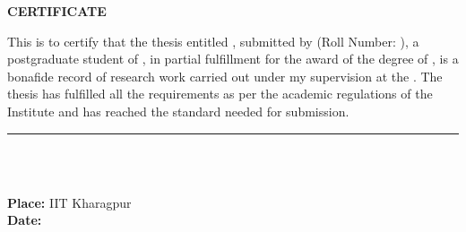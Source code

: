 \thispagestyle{plain}

\vspace{3\baselineskip}

\begin{center}
{\Large {\bf \uppercase{Certificate}}}
\end{center}

\vspace{\baselineskip}

\noindent This is to certify that the thesis entitled {\bf \mytitle}, submitted by {\bf \myname} (Roll Number: {\textit{\myrollno}}), a postgraduate student of {\bf \mydep}, in partial fulfillment for the award of the degree of {\bf \mydegree}, is a bonafide record of research work carried out under my supervision at the {\bf \myinst}. The thesis has fulfilled all the requirements as per the academic regulations of the Institute and has reached the standard needed for submission.

\vspace{3\baselineskip}
\begin{flushright}
\begin{minipage}[c]{0.5\textwidth}
\centering
\hrule 
\vspace{0.5\baselineskip}
{\large \bf \mysupervisor} \\
\vspace{0.2\baselineskip}
{\small \mydep} \\
{\small \myinst}
\end{minipage}
\end{flushright}
\vspace{\baselineskip}

\noindent
{\large \bf Place: } IIT Kharagpur \\
{\large \bf Date: } \mydegreedate

